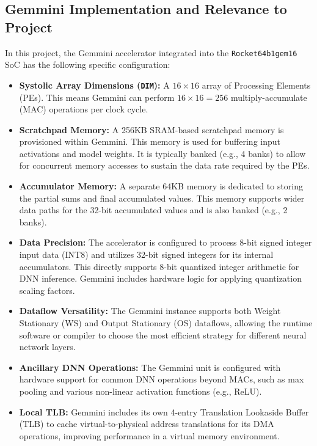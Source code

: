 \subsection{Gemmini Implementation and Relevance to Project}
\label{sec:gemmini_implementation}
In this project, the Gemmini accelerator integrated into the \texttt{Rocket64b1gem16} SoC has the following specific configuration:
\begin{itemize}
    \item \textbf{Systolic Array Dimensions (\texttt{DIM}):} A $16 \times 16$ array of Processing Elements (PEs). This means Gemmini can perform $16 \times 16 = 256$ multiply-accumulate (MAC) operations per clock cycle.
    \item \textbf{Scratchpad Memory:} A 256KB SRAM-based scratchpad memory is provisioned within Gemmini. This memory is used for buffering input activations and model weights. It is typically banked (e.g., 4 banks) to allow for concurrent memory accesses to sustain the data rate required by the PEs.
    \item \textbf{Accumulator Memory:} A separate 64KB memory is dedicated to storing the partial sums and final accumulated values. This memory supports wider data paths for the 32-bit accumulated values and is also banked (e.g., 2 banks).
    \item \textbf{Data Precision:} The accelerator is configured to process 8-bit signed integer input data (INT8) and utilizes 32-bit signed integers for its internal accumulators. This directly supports 8-bit quantized integer arithmetic for DNN inference. Gemmini includes hardware logic for applying quantization scaling factors.
    \item \textbf{Dataflow Versatility:} The Gemmini instance supports both Weight Stationary (WS) and Output Stationary (OS) dataflows, allowing the runtime software or compiler to choose the most efficient strategy for different neural network layers.
    \item \textbf{Ancillary DNN Operations:} The Gemmini unit is configured with hardware support for common DNN operations beyond MACs, such as max pooling and various non-linear activation functions (e.g., ReLU).
    \item \textbf{Local TLB:} Gemmini includes its own 4-entry Translation Lookaside Buffer (TLB) to cache virtual-to-physical address translations for its DMA operations, improving performance in a virtual memory environment.
\end{itemize}

